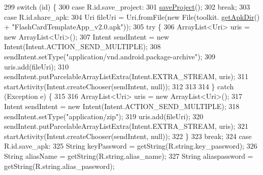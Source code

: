 \begin{DoxyCode}
299                         \textcolor{keywordflow}{switch} (\textcolor{keywordtype}{id}) \{
300                             \textcolor{keywordflow}{case} R.id.save\_project:
301                                 \hyperlink{classorg_1_1buildmlearn_1_1toolkit_1_1activity_1_1TemplateEditor_aaec7f80eb29a74505a25bed11c20c29d}{saveProject}();
302                                 \textcolor{keywordflow}{break};
303                             \textcolor{keywordflow}{case} R.id.share\_apk:
304                                 Uri fileUri = Uri.fromFile(\textcolor{keyword}{new} File(toolkit.
      \hyperlink{classorg_1_1buildmlearn_1_1toolkit_1_1ToolkitApplication_a976b0d6036419bd9382ffdca98b79fb4}{getApkDir}() + \textcolor{stringliteral}{"FlashCardTemplateApp\_v2.0.apk"}));
305                                 \textcolor{keywordflow}{try} \{
306                                     ArrayList<Uri> uris = \textcolor{keyword}{new} ArrayList<Uri>();
307                                     Intent sendIntent = \textcolor{keyword}{new} Intent(Intent.ACTION\_SEND\_MULTIPLE);
308                                     sendIntent.setType(\textcolor{stringliteral}{"application/vnd.android.package-archive"});
309                                     uris.add(fileUri);
310                                     sendIntent.putParcelableArrayListExtra(Intent.EXTRA\_STREAM, uris);
311                                     startActivity(Intent.createChooser(sendIntent, null));
312 
313 
314                                 \} \textcolor{keywordflow}{catch} (Exception e) \{
315 
316                                     ArrayList<Uri> uris = \textcolor{keyword}{new} ArrayList<Uri>();
317                                     Intent sendIntent = \textcolor{keyword}{new} Intent(Intent.ACTION\_SEND\_MULTIPLE);
318                                     sendIntent.setType(\textcolor{stringliteral}{"application/zip"});
319                                     uris.add(fileUri);
320                                     sendIntent.putParcelableArrayListExtra(Intent.EXTRA\_STREAM, uris);
321                                     startActivity(Intent.createChooser(sendIntent, null));
322                                 \}
323                                 \textcolor{keywordflow}{break};
324                             \textcolor{keywordflow}{case} R.id.save\_apk:
325                                 String keyPassword = getString(R.string.key\_password);
326                                 String aliasName = getString(R.string.alias\_name);
327                                 String aliaspassword = getString(R.string.alias\_password);

\end{DoxyCode}
